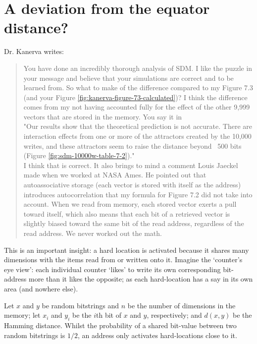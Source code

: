 \section{A deviation from the equator distance?}

Dr. Kanerva writes:

\begin{quote}
    You have done an incredibly thorough analysis of SDM. I like the puzzle in your message and believe that your simulations are correct and to be learned from.  So what to make of the difference compared to my Figure 7.3 (and your Figure \ref{fig:kanerva-figure-73-calculated})?  I think the difference comes from my not having accounted fully for the effect of the other 9,999 vectors that are stored in the memory.  You say it in \\

   "Our results show that the theoretical prediction is not accurate. There are interaction effects from one or more of the attractors created by the 10,000 writes, and these attractors seem to raise the distance beyond ~500 bits
   (Figure \ref{fig:sdm-10000w-table-7-2})." \\

   I think that is correct.  It also brings to mind a comment Louis Jaeckel made when we worked at NASA Ames.  He pointed out that autoassociative storage (each vector is stored with itself as the address) introduces autocorrelation that my formula for Figure 7.2 did not take into account.  When we read from memory, each stored vector exerts a pull toward itself, which also means that each bit of a retrieved vector is slightly biased toward the same bit of the read address, regardless of the read address.  We never worked out the math.
\end{quote}

This is an important insight: a hard location is activated because it shares many dimensions with the items read from or written onto it. Imagine the `counter's eye view':  each individual counter `likes' to write its own corresponding bit-address more than it likes the opposite; as each hard-location has a say in its own area (and nowhere else).

Let $x$ and $y$ be random bitstrings and $n$ be the number of dimensions in the memory; let $x_i$ and $y_i$ be the $i$th bit of $x$ and $y$, respectively; and $d(x, y)$ be the Hamming distance. Whilst the probability of a shared bit-value between two random bitstrings is $1/2$, an address only activates hard-locations close to it.

